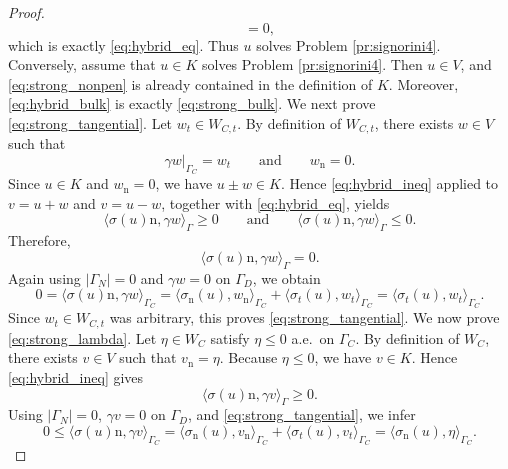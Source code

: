 \begin{proof}
\begin{equation*}
		=0,
	\end{equation*}
	which is exactly \eqref{eq:hybrid_eq}. Thus $u$ solves Problem \ref{pr:signorini4}. Conversely, assume that $u\in K$ solves Problem \ref{pr:signorini4}. Then $u\in V$, and \eqref{eq:strong_nonpen} is already contained in the definition of $K$. Moreover, \eqref{eq:hybrid_bulk} is exactly \eqref{eq:strong_bulk}. We next prove \eqref{eq:strong_tangential}. Let $w_t\in W_{C,t}$. By definition of $W_{C,t}$, there exists $w\in V$ such that
	\begin{equation*}
		\gamma w|_{\Gamma_C}=w_t
		\qquad\text{and}\qquad
		w_\mathrm n=0.
	\end{equation*}
	Since $u\in K$ and $w_\mathrm n=0$, we have $u\pm w\in K$. Hence \eqref{eq:hybrid_ineq} applied to $v=u+w$ and $v=u-w$, together with \eqref{eq:hybrid_eq}, yields
	\begin{equation*}
		\langle \sigma(u)\mathrm n,\gamma w\rangle_\Gamma\ge 0
		\qquad\text{and}\qquad
		\langle \sigma(u)\mathrm n,\gamma w\rangle_\Gamma\le 0.
	\end{equation*}
	Therefore,
	\begin{equation*}
		\langle \sigma(u)\mathrm n,\gamma w\rangle_\Gamma=0.
	\end{equation*}
	Again using $|\Gamma_N|=0$ and $\gamma w=0$ on $\Gamma_D$, we obtain
	\begin{equation*}
		0=\langle \sigma(u)\mathrm n,\gamma w\rangle_{\Gamma_C}
		=\langle \sigma_\mathrm n(u),w_\mathrm n\rangle_{\Gamma_C}
		+\langle \sigma_t(u),w_t\rangle_{\Gamma_C}
		=\langle \sigma_t(u),w_t\rangle_{\Gamma_C}.
	\end{equation*}
	Since $w_t\in W_{C,t}$ was arbitrary, this proves \eqref{eq:strong_tangential}. We now prove \eqref{eq:strong_lambda}. Let $\eta\in W_C$ satisfy $\eta\le 0$ a.e.\ on $\Gamma_C$. By definition of $W_C$, there exists $v\in V$ such that $v_\mathrm n=\eta$. Because $\eta\le 0$, we have $v\in K$. Hence \eqref{eq:hybrid_ineq} gives
	\begin{equation*}
		\langle \sigma(u)\mathrm n,\gamma v\rangle_\Gamma\ge 0.
	\end{equation*}
	Using $|\Gamma_N|=0$, $\gamma v=0$ on $\Gamma_D$, and \eqref{eq:strong_tangential}, we infer
	\begin{equation*}
		0\le \langle \sigma(u)\mathrm n,\gamma v\rangle_{\Gamma_C}
		=\langle \sigma_\mathrm n(u),v_\mathrm n\rangle_{\Gamma_C}
		+\langle \sigma_t(u),v_t\rangle_{\Gamma_C}
		=\langle \sigma_\mathrm n(u),\eta\rangle_{\Gamma_C}.
	\end{equation*}

\end{proof}

